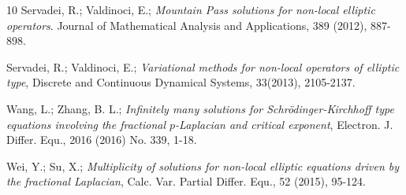 \documentclass[reqno]{amsart}
\begin{document}
\begin{thebibliography}{10}
 Servadei, R.; Valdinoci, E.;
\emph{Mountain Pass solutions for non-local elliptic operators}. Journal of
 Mathematical Analysis and Applications, 389 (2012), 887-898.

 Servadei, R.; Valdinoci, E.;
\emph{Variational methods for non-local operators of elliptic type}, 
Discrete and Continuous Dynamical Systems, 33(2013), 2105-2137.

 Wang, L.; Zhang, B. L.;
\emph{Infinitely many solutions for Schr\"odinger-Kirchhoff type equations involving 
the fractional $p$-Laplacian and critical exponent}, 
Electron. J. Differ. Equ., 2016 (2016) No. 339, 1-18.

 Wei, Y.; Su, X.;
\emph{Multiplicity of solutions for non-local elliptic equations driven by the 
fractional Laplacian}, Calc. Var. Partial Differ. Equ., 52 (2015), 95-124.

\end{thebibliography}
\end{document}
